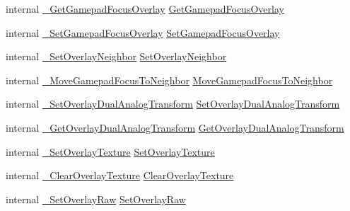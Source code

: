 \begin{DoxyCompactItemize}
\item 
internal \mbox{\hyperlink{struct_valve_1_1_v_r_1_1_i_v_r_overlay_a5d0bd8d9b0f09e1738bc3da860d9a0a1}{\+\_\+\+Get\+Gamepad\+Focus\+Overlay}} \mbox{\hyperlink{struct_valve_1_1_v_r_1_1_i_v_r_overlay_afdeef7855b25f0c1784f77cb8cedc738}{Get\+Gamepad\+Focus\+Overlay}}
\item 
internal \mbox{\hyperlink{struct_valve_1_1_v_r_1_1_i_v_r_overlay_a52e2a2a1d78d2bc21361fee22beb6b65}{\+\_\+\+Set\+Gamepad\+Focus\+Overlay}} \mbox{\hyperlink{struct_valve_1_1_v_r_1_1_i_v_r_overlay_a5a9d5b199a8812253ca3ab2b47e0ac3c}{Set\+Gamepad\+Focus\+Overlay}}
\item 
internal \mbox{\hyperlink{struct_valve_1_1_v_r_1_1_i_v_r_overlay_ac035a5a1c1aacd145f1268c402e3fe3d}{\+\_\+\+Set\+Overlay\+Neighbor}} \mbox{\hyperlink{struct_valve_1_1_v_r_1_1_i_v_r_overlay_ac73240b2e6ad8d31a4c45763453cdc62}{Set\+Overlay\+Neighbor}}
\item 
internal \mbox{\hyperlink{struct_valve_1_1_v_r_1_1_i_v_r_overlay_ae3ae1992c75afb63050b87c2e2c8bc48}{\+\_\+\+Move\+Gamepad\+Focus\+To\+Neighbor}} \mbox{\hyperlink{struct_valve_1_1_v_r_1_1_i_v_r_overlay_a4da6762b75768a1b0d29ec4b2758bfd3}{Move\+Gamepad\+Focus\+To\+Neighbor}}
\item 
internal \mbox{\hyperlink{struct_valve_1_1_v_r_1_1_i_v_r_overlay_ae1a52476bb06ce07f2f80b32bac7b577}{\+\_\+\+Set\+Overlay\+Dual\+Analog\+Transform}} \mbox{\hyperlink{struct_valve_1_1_v_r_1_1_i_v_r_overlay_aaba1bf2f9f74aa606c5dbdc8f77f59b1}{Set\+Overlay\+Dual\+Analog\+Transform}}
\item 
internal \mbox{\hyperlink{struct_valve_1_1_v_r_1_1_i_v_r_overlay_a9c8eb4e102476da54755cc70340f4c48}{\+\_\+\+Get\+Overlay\+Dual\+Analog\+Transform}} \mbox{\hyperlink{struct_valve_1_1_v_r_1_1_i_v_r_overlay_a4a41c3a02838c8d2bbc9307c7458bf71}{Get\+Overlay\+Dual\+Analog\+Transform}}
\item 
internal \mbox{\hyperlink{struct_valve_1_1_v_r_1_1_i_v_r_overlay_a213cd2c6bbe053b4e8359ca63a2d4089}{\+\_\+\+Set\+Overlay\+Texture}} \mbox{\hyperlink{struct_valve_1_1_v_r_1_1_i_v_r_overlay_a5263819c136d53b94cc42b72eea38be6}{Set\+Overlay\+Texture}}
\item 
internal \mbox{\hyperlink{struct_valve_1_1_v_r_1_1_i_v_r_overlay_a61c25dec5b16f1e2d942f792c7adc53b}{\+\_\+\+Clear\+Overlay\+Texture}} \mbox{\hyperlink{struct_valve_1_1_v_r_1_1_i_v_r_overlay_a2c8f47910e508e94f9cb380d4595ad3a}{Clear\+Overlay\+Texture}}
\item 
internal \mbox{\hyperlink{struct_valve_1_1_v_r_1_1_i_v_r_overlay_af2328af182be33f52a04f9a47242b811}{\+\_\+\+Set\+Overlay\+Raw}} \mbox{\hyperlink{struct_valve_1_1_v_r_1_1_i_v_r_overlay_a23b09badbcb891123c44ca7ad8e369ac}{Set\+Overlay\+Raw}}

\end{DoxyCompactItemize}

